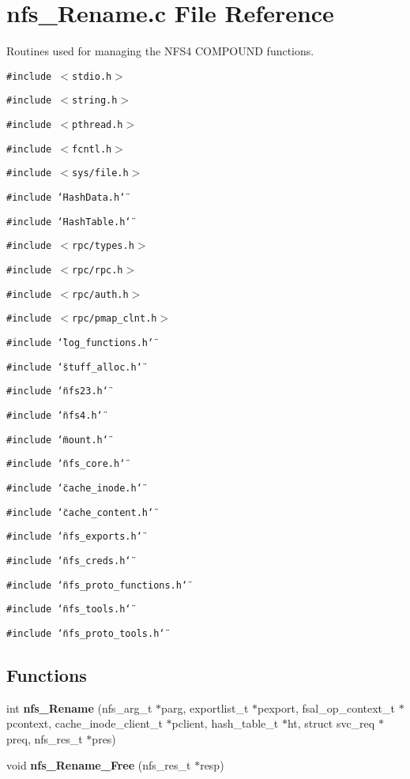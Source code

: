\section{nfs\_\-Rename.c File Reference}
\label{nfs__Rename_8c}
Routines used for managing the NFS4 COMPOUND functions. 

{\tt \#include $<$stdio.h$>$}\par
{\tt \#include $<$string.h$>$}\par
{\tt \#include $<$pthread.h$>$}\par
{\tt \#include $<$fcntl.h$>$}\par
{\tt \#include $<$sys/file.h$>$}\par
{\tt \#include \char`\"{}Hash\-Data.h\char`\"{}}\par
{\tt \#include \char`\"{}Hash\-Table.h\char`\"{}}\par
{\tt \#include $<$rpc/types.h$>$}\par
{\tt \#include $<$rpc/rpc.h$>$}\par
{\tt \#include $<$rpc/auth.h$>$}\par
{\tt \#include $<$rpc/pmap\_\-clnt.h$>$}\par
{\tt \#include \char`\"{}log\_\-functions.h\char`\"{}}\par
{\tt \#include \char`\"{}stuff\_\-alloc.h\char`\"{}}\par
{\tt \#include \char`\"{}nfs23.h\char`\"{}}\par
{\tt \#include \char`\"{}nfs4.h\char`\"{}}\par
{\tt \#include \char`\"{}mount.h\char`\"{}}\par
{\tt \#include \char`\"{}nfs\_\-core.h\char`\"{}}\par
{\tt \#include \char`\"{}cache\_\-inode.h\char`\"{}}\par
{\tt \#include \char`\"{}cache\_\-content.h\char`\"{}}\par
{\tt \#include \char`\"{}nfs\_\-exports.h\char`\"{}}\par
{\tt \#include \char`\"{}nfs\_\-creds.h\char`\"{}}\par
{\tt \#include \char`\"{}nfs\_\-proto\_\-functions.h\char`\"{}}\par
{\tt \#include \char`\"{}nfs\_\-tools.h\char`\"{}}\par
{\tt \#include \char`\"{}nfs\_\-proto\_\-tools.h\char`\"{}}\par
\subsection*{Functions}
\begin{CompactItemize}
\item 
int {\bf nfs\_\-Rename} (nfs\_\-arg\_\-t $\ast$parg, exportlist\_\-t $\ast$pexport, fsal\_\-op\_\-context\_\-t $\ast$pcontext, cache\_\-inode\_\-client\_\-t $\ast$pclient, hash\_\-table\_\-t $\ast$ht, struct svc\_\-req $\ast$preq, nfs\_\-res\_\-t $\ast$pres)
\item 
void {\bf nfs\_\-Rename\_\-Free} (nfs\_\-res\_\-t $\ast$resp)
\end{CompactItemize}


